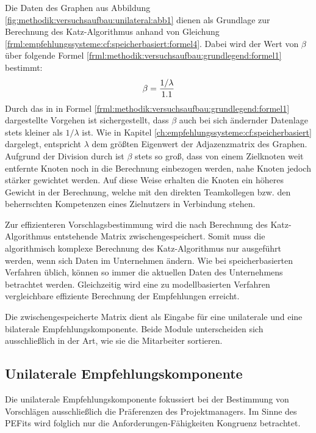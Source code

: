 Die Daten des Graphen aus Abbildung \ref{fig:methodik:versuchsaufbau:unilateral:abb1} dienen als Grundlage zur Berechnung des Katz-Algorithmus anhand von Gleichung \ref{frml:empfehlungssysteme:cf:speicherbasiert:formel4}. Dabei wird der Wert von $\beta$ über folgende Formel \ref{frml:methodik:versuchsaufbau:grundlegend:formel1} bestimmt: 
\begin{equation}
	\beta = \frac{1/\lambda}{1.1}
	\label{frml:methodik:versuchsaufbau:grundlegend:formel1}
\end{equation}
Durch das in in Formel \ref{frml:methodik:versuchsaufbau:grundlegend:formel1} dargestellte Vorgehen ist sichergestellt, dass $\beta$ auch bei sich ändernder Datenlage stets kleiner als $1/\lambda$ ist. Wie in Kapitel \ref{ch:empfehlungssysteme:cf:speicherbasiert} dargelegt, entspricht $\lambda$ dem größten Eigenwert der Adjazenzmatrix des Graphen. Aufgrund der Division durch \nenner ist $\beta$ stets so groß, dass von einem Zielknoten weit entfernte Knoten noch in die Berechnung einbezogen werden, nahe Knoten jedoch stärker gewichtet werden. Auf diese Weise erhalten die Knoten ein höheres Gewicht in der Berechnung, welche mit den direkten Teamkollegen bzw. den beherrschten Kompetenzen eines Zielnutzers in Verbindung stehen.

Zur effizienteren Vorschlagsbestimmung wird die nach Berechnung des Katz-Algorithmus entstehende Matrix zwischengespeichert. Somit muss die algorithmisch komplexe Berechnung des Katz-Algorithmus nur ausgeführt werden, wenn sich Daten im Unternehmen ändern. Wie bei speicherbasierten Verfahren üblich, können so immer die aktuellen Daten des Unternehmens betrachtet werden. Gleichzeitig wird eine zu modellbasierten Verfahren vergleichbare effiziente Berechnung der Empfehlungen erreicht.

Die zwischengespeicherte Matrix dient als Eingabe für eine unilaterale und eine bilaterale Empfehlungskomponente. Beide Module unterscheiden sich ausschließlich in der Art, wie sie die Mitarbeiter sortieren.

\subsection{Unilaterale Empfehlungskomponente}
\label{ch:methodik:versuchsaufbau:unilateral}
Die unilaterale Empfehlungskomponente fokussiert bei der Bestimmung von Vorschlägen ausschließlich die Präferenzen des Projektmanagers. Im Sinne des \acp{PEFit} wird folglich nur die Anforderungen-Fähigkeiten Kongruenz betrachtet.

